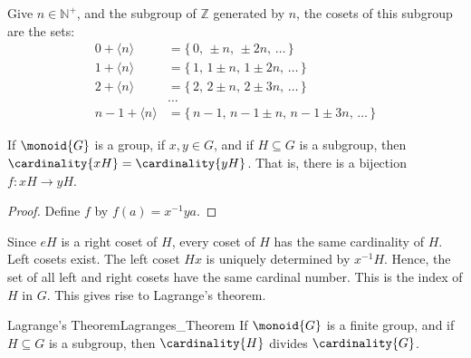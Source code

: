 \documentclass{article}                                                        %
\begin{document}
                \begin{example}
                    Give $n\in\mathbb{N}^{+}$, and the subgroup of $\mathbb{Z}$
                    generated by $n$, the cosets of this subgroup are the
                    sets:
                    \begin{subequations}
                        \begin{align}
                            0+\langle{n}\rangle
                                &=\{\,0,\,\pm{n},\,\pm{2}n,\,\dots\,\}\\
                            1+\langle{n}\rangle
                                &=\{\,1,\,1\pm{n},\,1\pm{2}n,\,\dots\,\}\\
                            2+\langle{n}\rangle
                                &=\{\,2,\,2\pm{n},\,2\pm{3}n,\,\dots\,\}\\
                            &\hdots\\
                            n-1+\langle{n}\rangle
                            &=\{\,n-1,\,n-1\pm{n},\,n-1\pm{3}n,\,\dots\,\}
                        \end{align}
                    \end{subequations}
                \end{example}
                \begin{theorem}
                    If $\monoid{G}$ is a group, if $x,y\in{G}$, and if
                    $H\subseteq{G}$ is a subgroup, then
                    $\cardinality{xH}=\cardinality{yH}$. That is, there is a
                    bijection $f:xH\rightarrow{y}H$.
                \end{theorem}
                \begin{proof}
                    Define $f$ by $f(a)=x^{\minus{1}}ya$.
                \end{proof}
                Since $eH$ is a right coset of $H$, every coset of $H$ has the
                same cardinality of $H$. Left cosets exist. The left coset
                $Hx$ is uniquely determined by $x^{\minus{1}}H$. Hence, the set
                of all left and right cosets have the same cardinal number. This
                is the index of $H$ in $G$. This gives rise to Lagrange's
                theorem.
                \begin{ftheorem}{Lagrange's Theorem}{Lagranges_Theorem}
                    If $\monoid{G}$ is a finite group, and if $H\subseteq{G}$
                    is a subgroup, then $\cardinality{H}$ divides
                    $\cardinality{G}$.
                \end{ftheorem}
\end{document}
